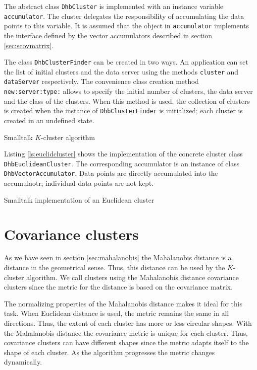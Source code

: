 \documentclass[twoside]{book}
\begin{document}
The abstract class {\tt DhbCluster} is implemented with an
instance variable {\tt accumulator}. The cluster delegates the
responsibility of accumulating the data points to this variable.
It is assumed that the object in {\tt accumulator} implements the
interface defined by the vector accumulators described in section
\ref{sec:scovmatrix}.

The class {\tt DhbClusterFinder} can be created in two ways. An
application can set the list of initial clusters and the data
server using the methods {\tt cluster} and {\tt dataServer}
respectively. The convenience class creation method {\tt
new:server:type:} allows to specify the initial number of
clusters, the data server and the class of the clusters. When this
method is used, the collection of clusters is created when the
instance of {\tt DhbClusterFinder} is initialized; each cluster is
created in an undefined state.

\begin{listing} Smalltalk $K$-cluster algorithm \label{ls:clusterfinder}


\end{listing}
Listing \ref{ls:euclidcluster} shows the implementation of the
concrete cluster class {\tt DhbEuclideanCluster}. The
corresponding accumulator is an instance of class {\tt
DhbVectorAccumulator}. Data points are directly accumulated into
the accumulaotr; individual data points are not kept.
\begin{listing} Smalltalk implementation of an Euclidean cluster \label{ls:euclidcluster}

\end{listing}


\section{Covariance clusters}
\label{sec:mahalanobiscluster} As we have seen in section
\ref{sec:mahalanobis} the Mahalanobis distance is a distance in
the geometrical sense. Thus, this distance can be used by the
$K$-cluster algorithm. We call clusters using the Mahalanobis
distance covariance clusters since the metric for the distance is
based on the covariance matrix.

The normalizing properties of the Mahalanobis distance makes it
ideal for this task. When Euclidean distance is used, the metric
remains the same in all directions. Thus, the extent of each
cluster has more or less circular shapes. With the Mahalanobis
distance the covariance metric is unique for each cluster. Thus,
covariance clusters can have different shapes since the metric
adapts itself to the shape of each cluster. As the algorithm
progresses the metric changes dynamically.
\end{document}
